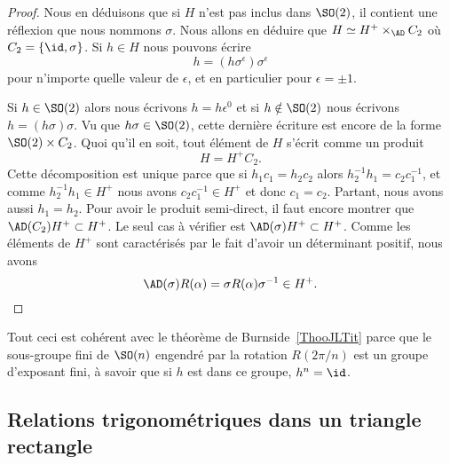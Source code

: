 \begin{proof}
	Nous en déduisons que si \( H\) n'est pas inclus dans \( \SO(2)\), il contient une réflexion que nous nommons \( \sigma\). Nous allons en déduire que \( H\simeq H^+\times_{\AD}C_2\) où \( C_2=\{ \id,\sigma \}\). Si \( h\in H\) nous pouvons écrire
	\begin{equation}
		h=(h\sigma^{\epsilon})\sigma^{\epsilon}
	\end{equation}
	pour n'importe quelle valeur de \( \epsilon\), et en particulier pour \( \epsilon=\pm 1\).

	Si \( h\in \SO(2)\) alors nous écrivons \( h=h\epsilon^{0}\) et si \( h\notin\SO(2)\) nous écrivons \( h=(h\sigma)\sigma\). Vu que \( h\sigma\in\SO(2)\), cette dernière écriture est encore de la forme \( \SO(2)\times C_2\). Quoi qu'il en soit, tout élément de \( H\) s'écrit comme un produit
	\begin{equation}
		H=H^+C_2.
	\end{equation}
	Cette décomposition est unique parce que si \( h_1c_1=h_2c_2\) alors \( h_2^{-1}h_1=c_2c_1^{-1}\), et comme \( h_2^{-1}h_1\in H^+\) nous avons \( c_2c_1^{-1}\in H^+\) et donc \( c_1=c_2\). Partant, nous avons aussi \( h_1=h_2\). Pour avoir le produit semi-direct, il faut encore montrer que \( \AD(C_2)H^+\subset H^+\). Le seul cas à vérifier est \( \AD(\sigma)H^+\subset H^+\). Comme les éléments de \( H^+\) sont caractérisés par le fait d'avoir un déterminant positif, nous avons
	\begin{equation}
		\AD(\sigma)R(\alpha)=\sigma R(\alpha)\sigma^{-1}\in H^+.
	\end{equation}
\end{proof}

\begin{remark}
	Tout ceci est cohérent avec le théorème de Burnside~\ref{ThooJLTit} parce que le sous-groupe fini de \( \SO(n)\) engendré par la rotation \( R(2\pi/n)\) est un groupe d'exposant fini, à savoir que si \( h\) est dans ce groupe, \( h^n=\id\).
\end{remark}

\subsection{Relations trigonométriques dans un triangle rectangle}


